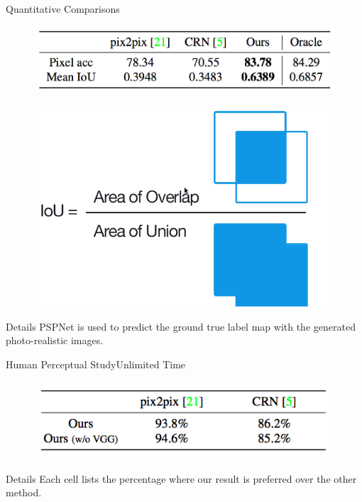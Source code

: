 \documentclass{beamer}
\begin{document}
\begin{frame}{Quantitative Comparisons }
\begin{figure}
	\centering
	\includegraphics[height=0.25\textheight]{images/table_1}
\end{figure}
\begin{figure}
	\centering
	\includegraphics[height=0.25\textheight]{images/IoU}
\end{figure}
%
%
\begin{beamerboxesrounded}[upper=uppercol,lower=lowercol,shadow=false]{Details }
 PSPNet is used  to predict the ground true label map with the generated photo-realistic images.
\end{beamerboxesrounded}

\end{frame}


\begin{frame}{Human Perceptual Study}{Unlimited Time}
\begin{figure}
	\centering
	\includegraphics[height=0.35\textheight]{images/unlimite_time}
\end{figure}
%
%
\begin{beamerboxesrounded}[upper=uppercol,lower=lowercol,shadow=false]{Details }
Each cell lists the percentage where our result is preferred over the other method.
\end{beamerboxesrounded}
\end{frame}
\end{document}
